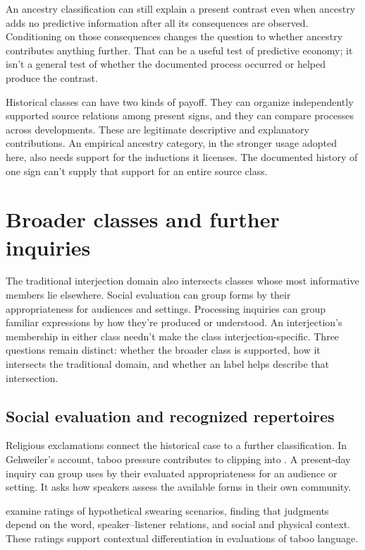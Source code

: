 \documentclass[12pt]{article}
\begin{document}
An ancestry classification can still explain a present contrast even
when ancestry adds no predictive information after all its consequences
are observed. Conditioning on those consequences changes the question
to whether ancestry contributes anything further. That can be a useful
test of predictive economy; it isn't a general test of whether the
documented process occurred or helped produce the contrast.

Historical classes can have two kinds of payoff. They can
organize independently supported source relations among present signs,
and they can compare processes across developments. These are legitimate
descriptive and explanatory contributions. An empirical ancestry category,
in the stronger usage adopted here, also needs support for the
inductions it licenses. The documented history of one sign can't supply
that support for an entire source class.

\section{Broader classes and further inquiries}\label{sec:extensions}

The traditional interjection domain also intersects classes whose most
informative members lie elsewhere. Social evaluation can group forms
by their appropriateness for audiences and settings. Processing inquiries
can group familiar expressions by how they're produced or understood.
An interjection's membership in either class needn't make the class
interjection-specific. Three questions remain distinct: whether the
broader class is supported, how it intersects the traditional domain,
and whether an  label helps describe that intersection.

\subsection{Social evaluation and recognized repertoires}

Religious exclamations connect the historical case to a further classification.
In Gehweiler's account, taboo pressure contributes to clipping 
into . A present-day inquiry can group uses by their
evaluated appropriateness for an audience or setting. It asks how
speakers assess the available forms in their own community.

\textcite{jayjanschewitz2008} examine ratings of hypothetical swearing scenarios,
finding that judgments depend on the word, speaker--listener relations,
and social and physical context. These ratings support contextual
differentiation in evaluations of taboo language.
\end{document}
